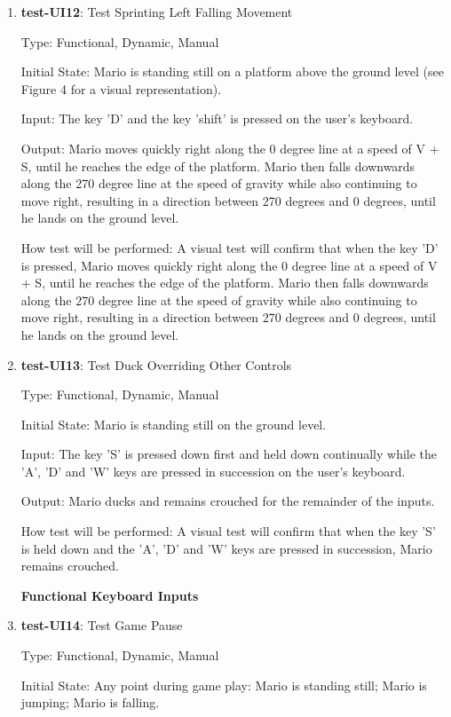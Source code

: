 \documentclass[12pt, titlepage]{article}
\begin{document}
\begin{enumerate}
\item{\textbf{test-UI12}: Test Sprinting Left Falling Movement\\}

Type: Functional, Dynamic, Manual

Initial State: Mario is standing still on a platform above the ground level (see Figure 4 for a visual representation).

Input: The key 'D' and the key 'shift' is pressed on the user's keyboard.

Output: Mario moves quickly right along the 0 degree line at a speed of V + S, until he reaches the edge of the platform. Mario then falls downwards along the 270 degree line at the speed of gravity while also continuing to move right, resulting in a direction between 270 degrees and 0 degrees, until he lands on the ground level.

How test will be performed: A visual test will confirm that when the key 'D' is pressed, Mario moves quickly right along the 0 degree line at a speed of V + S, until he reaches the edge of the platform. Mario then falls downwards along the 270 degree line at the speed of gravity while also continuing to move right, resulting in a direction between 270 degrees and 0 degrees, until he lands on the ground level.

\item{\textbf{test-UI13}: Test Duck Overriding Other Controls\\}

Type: Functional, Dynamic, Manual

Initial State: Mario is standing still on the ground level.

Input: The key 'S' is pressed down first and held down continually while the 'A', 'D' and 'W' keys are pressed in succession on the user's keyboard.

Output: Mario ducks and remains crouched for the remainder of the inputs.

How test will be performed: A visual test will confirm that when the key 'S' is held down and the 'A', 'D' and 'W' keys are pressed in succession, Mario remains crouched.

\textbf{Functional Keyboard Inputs}

\item{\textbf{test-UI14}: Test Game Pause\\}

Type: Functional, Dynamic, Manual

Initial State: Any point during game play: Mario is standing still; Mario is jumping; Mario is falling.


\end{enumerate}
\end{document}
